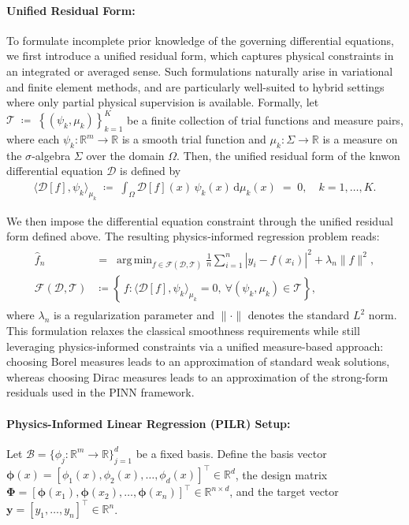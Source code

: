 \documentclass{article}
\DeclareMathOperator*{\argmin}{arg\,min}
\theoremstyle{plain}
\theoremstyle{definition}
\theoremstyle{remark}
\begin{document}
\paragraph{Unified Residual Form:} To formulate incomplete prior knowledge of the governing differential equations, we first introduce a unified residual form, which captures physical constraints in an integrated or averaged sense. Such formulations naturally arise in variational and finite element methods, and are particularly well-suited to hybrid settings where only partial physical supervision is available. 
Formally, let $\mathcal{T} \;\coloneqq\; \left\{(\psi_k,\mu_k)\right\}_{k=1}^K$ be a finite collection of trial functions and measure pairs, where each \(\psi_k:\mathbb{R}^m\to\mathbb{R}\) is a smooth trial function and \(\mu_k: \Sigma \to \mathbb{R}\) is a measure on the \(\sigma\)‐algebra \(\Sigma\) over the domain \(\Omega\). Then, the unified residual form of the knwon differential equation $\mathscr{D}$ is defined by
\begin{align*}
\langle \mathscr{D}[f],\psi_k\rangle_{\mu_k}
\;\coloneqq\;\int_{\Omega}\!\mathscr{D}[f](x)\,\psi_k(x)\,\mathrm{d}\mu_k(x)
\;=\;0,
\quad k=1,\dots,K.
\end{align*}

We then impose the differential equation constraint through the unified residual form defined above. The resulting physics‐informed regression problem reads:
\begin{gather}
  \label{eq:problem}
  \begin{aligned}
    \hat f_n
    &=\;\argmin_{f\in\mathcal{F}(\mathscr{D},\mathcal{T})}
      \frac{1}{n}\sum_{i=1}^n \left|y_i - f(x_i)\right|^2
      + \lambda_n \|f\|^2,\\
    \mathcal{F}(\mathscr{D},\mathcal{T})
    &\coloneqq
      \left\{\,f : \langle \mathscr{D}[f],\psi_k\rangle_{\mu_k}=0,\ 
      \forall(\psi_k,\mu_k)\in\mathcal{T}\right\},
  \end{aligned}
\end{gather}
where \(\lambda_n\) is a regularization parameter and \(\|\cdot\|\) denotes the standard \(L^2\) norm. This formulation relaxes the classical smoothness requirements while still leveraging physics-informed constraints via a unified measure-based approach: choosing Borel measures leads to an approximation of standard weak solutions, whereas choosing Dirac measures leads to an approximation of the strong-form residuals used in the PINN framework.

\paragraph{Physics-Informed Linear Regression (PILR) Setup:} Let $\mathcal{B}=\{\phi_j:\mathbb{R}^m\to\mathbb{R}\}_{j=1}^d$ be a fixed basis. Define the basis vector $\boldsymbol{\phi}(x) = [\phi_1(x), \phi_2(x), \dots, \phi_d(x)]^\top \in \mathbb{R}^d$, the design matrix $\mathbf{\Phi} = [\boldsymbol{\phi}(x_1), \boldsymbol{\phi}(x_2), \dots, \boldsymbol{\phi}(x_n)]^\top \in \mathbb{R}^{n \times d}$, and the target vector $\boldsymbol{y}=[y_1,\dots,y_n]^\top\in\mathbb{R}^n$.
\end{document}
